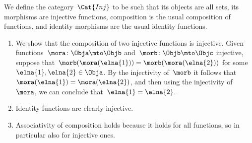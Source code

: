 \begin{solution}
    We define the category~$\Cat{Inj}$ to be such that its objects are all sets, its morphisms are injective functions, composition is the usual composition of functions, and identity morphisms are the usual identity functions.
    \begin{enumerate}
        \item We show that the composition of two injective functions is injective.
              Given functions~$\mora \colon \Obja \mto  \Objb$ and~$\morb \colon \Objb \mto \Objc$ injective, suppose that~$\morb(\mora (\elna{1})) = \morb(\mora (\elna{2}))$ for some~$\elna{1}, \elna{2} \in \Obja$.
              By the injectivity of~$\morb$ it follows that~$\mora (\elna{1}) = \mora (\elna{2})$, and then using the injectivity of~$\mora$, we can conclude that~$\elna{1} = \elna{2}$.
        \item Identity functions are clearly injective.
        \item Associativity of composition holds because it holds for all functions, so in particular also for injective ones.
    \end{enumerate}
\end{solution}

